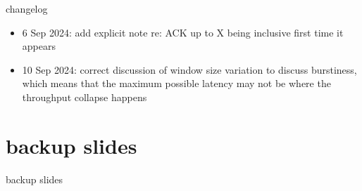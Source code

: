 \date{}
\title{}
\date{}
\usepackage{pgfplots}
\pgfplotsset{compat=1.16}

\begin{frame}
    \titlepage
\end{frame}

{\changelogmode
\begin{frame}{changelog}
    \begin{itemize}
    \item 6 Sep 2024: add explicit note re: ACK up to X being inclusive first time it appears
    \item 10 Sep 2024: correct discussion of window size variation to discuss burstiness, which means that the maximum possible latency may not be where the throughput collapse happens
    \end{itemize}
\end{frame}
}



\section{backup slides}
\begin{frame}{backup slides}
\end{frame}


